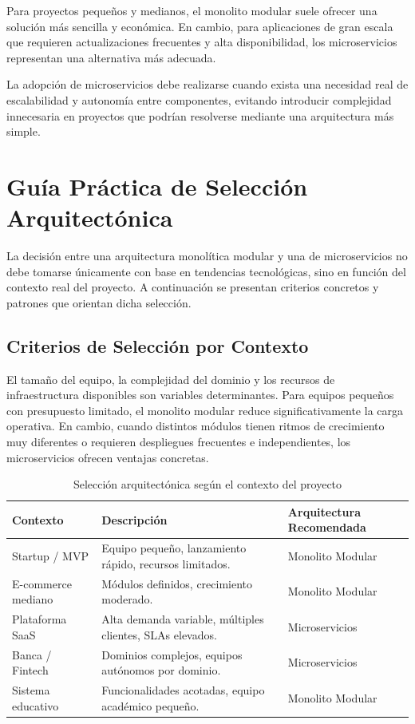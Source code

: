 \documentclass[12pt,a4paper]{article}
\begin{document}
Para proyectos pequeños y medianos, el monolito modular suele ofrecer una solución más sencilla y económica. En cambio, para aplicaciones de gran escala que requieren actualizaciones frecuentes y alta disponibilidad, los microservicios representan una alternativa más adecuada.

La adopción de microservicios debe realizarse cuando exista una necesidad real de escalabilidad y autonomía entre componentes, evitando introducir complejidad innecesaria en proyectos que podrían resolverse mediante una arquitectura más simple.

\section{Guía Práctica de Selección Arquitectónica}

La decisión entre una arquitectura monolítica modular y una de microservicios no debe tomarse únicamente con base en tendencias tecnológicas, sino en función del contexto real del proyecto. A continuación se presentan criterios concretos y patrones que orientan dicha selección.

\subsection{Criterios de Selección por Contexto}

El tamaño del equipo, la complejidad del dominio y los recursos de infraestructura disponibles son variables determinantes. Para equipos pequeños con presupuesto limitado, el monolito modular reduce significativamente la carga operativa. En cambio, cuando distintos módulos tienen ritmos de crecimiento muy diferentes o requieren despliegues frecuentes e independientes, los microservicios ofrecen ventajas concretas.

\begin{table}[h]
\centering
\begin{tabular}{|p{3.5cm}|p{5.5cm}|p{3.5cm}|}
\hline
\textbf{Contexto} & \textbf{Descripción} & \textbf{Arquitectura Recomendada} \\
\hline
Startup / MVP & Equipo pequeño, lanzamiento rápido, recursos limitados. & Monolito Modular \\
\hline
E-commerce mediano & Módulos definidos, crecimiento moderado. & Monolito Modular \\
\hline
Plataforma SaaS & Alta demanda variable, múltiples clientes, SLAs elevados. & Microservicios \\
\hline
Banca / Fintech & Dominios complejos, equipos autónomos por dominio. & Microservicios \\
\hline
Sistema educativo & Funcionalidades acotadas, equipo académico pequeño. & Monolito Modular \\
\hline
\end{tabular}
\caption{Selección arquitectónica según el contexto del proyecto}
\label{tab:seleccion}
\end{table}
\end{document}

